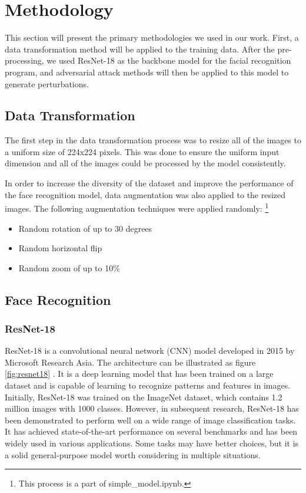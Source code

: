 \section{Methodology}

This section will present the primary methodologies we used in our work. First, a data transformation method will be applied to the training data. After the pre-processing, we used ResNet-18 as the backbone model for the facial recognition program, and adversarial attack methods will then be applied to this model to generate perturbations. 

\subsection{Data Transformation}

The first step in the data transformation process was to resize all of the images to a uniform size of 224x224 pixels. This was done to ensure the uniform input dimension and all of the images could be processed by the model consistently. 

In order to increase the diversity of the dataset and improve the performance of the face recognition model, data augmentation was also applied to the resized images. The following augmentation techniques were applied randomly:
\footnote{This process is a part of simple\_model.ipynb.}

\begin{itemize}
    \item Random rotation of up to 30 degrees
    \item Random horizontal flip
    \item Random zoom of up to 10\%
\end{itemize}


\subsection{Face Recognition}

\subsubsection{ResNet-18}


ResNet-18 is a convolutional neural network (CNN) model developed in 2015 by Microsoft Research Asia. The architecture can be illustrated as figure \ref{fig:resnet18} \cite{ResNet-18}. It is a deep learning model that has been trained on a large dataset and is capable of learning to recognize patterns and features in images. Initially, ResNet-18 was trained on the ImageNet dataset, which contains 1.2 million images with 1000 classes. However, in subsequent research, ResNet-18 has been demonstrated to perform well on a wide range of image classification tasks. It has achieved state-of-the-art performance on several benchmarks and has been widely used in various applications. Some tasks may have better choices, but it is a solid general-purpose model worth considering in multiple situations.\\


